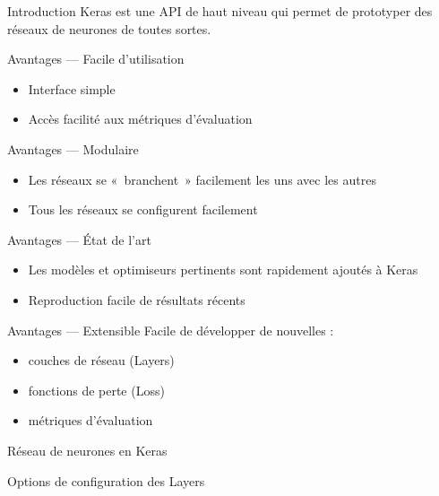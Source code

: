 \begin{frame}{Introduction}
  Keras est une API de haut niveau qui permet de prototyper des réseaux de neurones de toutes sortes.

\end{frame}

\begin{frame}{Avantages --- Facile d'utilisation}
  \begin{itemize}[<+->]
    \item Interface simple
    \item Accès facilité aux métriques d'évaluation
  \end{itemize}
\end{frame}

\begin{frame}{Avantages --- Modulaire}
  \begin{itemize}[<+->]
    \item Les réseaux se «~branchent~» facilement les uns avec les autres
    \item Tous les réseaux se configurent facilement
  \end{itemize}
\end{frame}

\begin{frame}{Avantages --- État de l'art}
  \begin{itemize}[<+->]
    \item Les modèles et optimiseurs pertinents sont rapidement ajoutés à Keras
    \item Reproduction facile de résultats récents
  \end{itemize}
\end{frame}

\begin{frame}{Avantages --- Extensible}
  Facile de développer de nouvelles :
  \begin{itemize}[<+(1)->]
    \item couches de réseau (Layers)
    \item fonctions de perte (Loss)
    \item métriques d'évaluation
  \end{itemize}
\end{frame}

\begin{frame}{Réseau de neurones en Keras}
\end{frame}

\begin{frame}{Options de configuration des Layers}
\end{frame}


